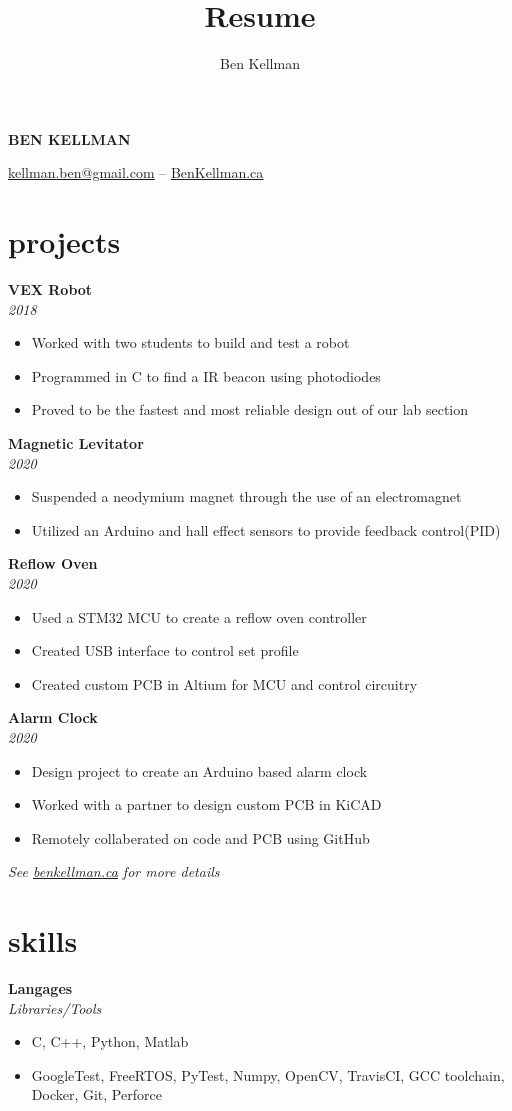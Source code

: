 \documentclass{article}
\author{Ben Kellman}
\title{Resume}
\newcommand{\minicolumns}[2]{
  \begin{minipage}[t]{0.25\textwidth}
    \begin{flushright}
      #1
    \end{flushright}
  \end{minipage}
  \hfill    
  \begin{minipage}[t]{0.7\textwidth}
    #2
  \end{minipage}   
}
\newcommand{\resumeSection}[3]{
  \minicolumns{
      \textbf{#1}\\          
      \textit{#2}
    }
    {  
      \begin{itemize}[leftmargin=*]
          \setlength\itemsep{-0.1em}
          #3
      \end{itemize}
  }
  \vspace{1em}
}
\begin{document}
\begin{center}
  \textbf{\LARGE{\MakeUppercase{Ben Kellman}}}
  
  \vspace{0.75em}
  \underline{\href{mailto: kellman.ben@gmail.com}{kellman.ben@gmail.com}} -- \underline{\href{www.BenKellman.ca}{BenKellman.ca}}

\end{center}
\vspace{1em}

\begin{minipage}[t]{0.65\textwidth}
  \section{projects}
  
  \resumeSection{VEX Robot}{2018}{
      \item Worked with two students to build and test a robot
      \item Programmed in C to find a IR beacon using photodiodes
      \item Proved to be the fastest and most reliable design out of our lab section 
  }

  \resumeSection{Magnetic Levitator}{2020}{
      \item Suspended a neodymium magnet through the use of an electromagnet
      \item Utilized an Arduino and hall effect sensors to provide feedback control(PID)
  }

  \resumeSection{Reflow Oven}{2020}{
      \item Used a STM32 MCU to create a reflow oven controller
      \item Created USB interface to control set profile
      \item Created custom PCB in Altium for MCU and control circuitry
  }

  \resumeSection{Alarm Clock}{2020}{
      \item Design project to create an Arduino based alarm clock
      \item Worked with a partner to design custom PCB in KiCAD
      \item Remotely collaberated on code and PCB using GitHub
  }
  
  \textit{See \underline{\href{www.benkellman.ca}{benkellman.ca}} for more details}

  \section{skills}
  \resumeSection{Langages}{Libraries/Tools}{
    \item C, C++, Python, Matlab
    \item GoogleTest, FreeRTOS, PyTest, Numpy, OpenCV, TravisCI, GCC toolchain, Docker, Git, Perforce
  }


\end{minipage}
\end{document}
